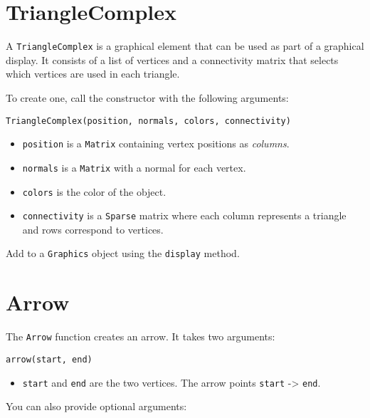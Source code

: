 \hypertarget{trianglecomplex}{%
\section{TriangleComplex}\label{trianglecomplex}}

A \texttt{TriangleComplex} is a graphical element that can be used as
part of a graphical display. It consists of a list of vertices and a
connectivity matrix that selects which vertices are used in each
triangle.

To create one, call the constructor with the following arguments:

\begin{lstlisting}
TriangleComplex(position, normals, colors, connectivity)
\end{lstlisting}

\begin{itemize}

\item
  \texttt{position} is a \texttt{Matrix} containing vertex positions as
  \emph{columns}.
\item
  \texttt{normals} is a \texttt{Matrix} with a normal for each vertex.
\item
  \texttt{colors} is the color of the object.
\item
  \texttt{connectivity} is a \texttt{Sparse} matrix where each column
  represents a triangle and rows correspond to vertices.
\end{itemize}

Add to a \texttt{Graphics} object using the \texttt{display} method.

\hypertarget{arrow}{%
\section{Arrow}\label{arrow}}

The \texttt{Arrow} function creates an arrow. It takes two arguments:

\begin{lstlisting}
arrow(start, end)
\end{lstlisting}

\begin{itemize}

\item
  \texttt{start} and \texttt{end} are the two vertices. The arrow points
  \texttt{start} -\textgreater{} \texttt{end}.
\end{itemize}

You can also provide optional arguments:

